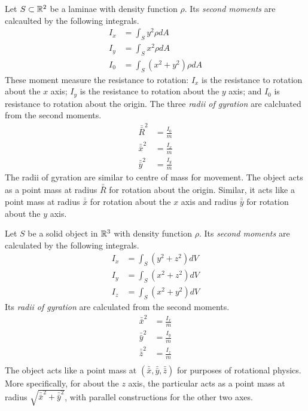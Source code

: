 \documentclass[fleqn,letterpaper]{report}
\begin{document}
Let $S \subset \mathbb{R}^2$ be a laminae with density function
$\rho$. Its \emph{second moments} are calcaulted by the
following integrals.
\begin{align*}
I_x & = \int_S y^2 \rho dA \\
I_y & = \int_S x^2 \rho dA \\
I_0 & = \int_S (x^2+y^2) \rho dA 
\end{align*}
These moment measure the resistance to rotation: $I_x$ is the
resistance to rotation about the $x$ axis; $I_y$ is the
resistance to rotation about the $y$ axis; and $I_0$ is
resistance to rotation about the origin. The three \emph{radii
of gyration} are calcluated from the second moments.
\begin{align*}
\bar{\bar{R}}^2 & = \frac{I_0}{m} \\
\bar{\bar{x}}^2 & = \frac{I_x}{m} \\
\bar{\bar{y}}^2 & = \frac{I_y}{m} 
\end{align*}
The radii of gyration are similar to centre of mass for
movement. The object acts as a point mass at radius
$\bar{\bar{R}}$ for rotation about the origin. Similar, it
acts like a point mass at radius $\bar{\bar{x}}$ for rotation
about the $x$ axis and radius $\bar{\bar{y}}$ for rotation
about the $y$ axis.

Let $S$ be a solid object in $\mathbb{R}^3$ with density function
$\rho$. Its \emph{second moments} are calculated by the
following integrals.
\begin{align*}
I_x & = \int_S (y^2 + z^2) dV \\
I_y & = \int_S (x^2 + z^2) dV \\
I_z & = \int_S (x^2 + y^2) dV 
\end{align*}
Its \emph{radii of gyration} are calculated from the second
moments.
\begin{align*}
\bar{\bar{x}}^2 & = \frac{I_x}{m} \\
\bar{\bar{y}}^2 & = \frac{I_y}{m} \\
\bar{\bar{z}}^2 & = \frac{I_z}{m} \\
\end{align*}
The object acts like a point mass at $(\bar{\bar{x}},
\bar{\bar{y}}, \bar{\bar{z}})$ for purposes of rotational
physics. More specifically, for about the $z$ axis, the
particular acts as a point mass at radius
$\sqrt{\bar{\bar{x}}^2 + \bar{\bar{y}}^2}$, with parallel
constructions for the other two axes.
\end{document}
